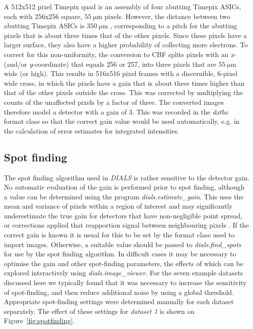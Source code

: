 \documentclass[preprint]{iucr}
\newcommand{\dxtbx}{\emph{dxtbx}\xspace}
\newcommand{\dials}{\emph{DIALS}\xspace}
\newcommand{\dialsestimategain}{\emph{dials.estimate\_gain}\xspace}
\newcommand{\dialsfindspots}{\emph{dials.find\_spots}\xspace}
\newcommand{\dialsimageviewer}{\emph{dials.image\_viewer}\xspace}
\begin{document}
A 512x512 pixel Timepix quad is an assembly of four abutting Timepix ASICs, 
each with 256x256 square, $\SI{55}{\micro\metre}$ pixels. However, the distance 
between two abutting Timepix ASICs is $\SI{350}{\micro\metre}$ , corresponding 
to a pitch for the abutting pixels that is about three times that of the other 
pixels. Since these pixels have a larger surface, they also have a higher probability 
of collecting more electrons. To correct for this non-uniformity, the conversion to 
CBF splits pixels with an \emph{x}- (and/or \emph{y}-coordinate) that equals 256 or 257, into three 
pixels that are $\SI{55}{\micro\metre}$ wide (or high). This results in 516x516 pixel 
frames with a discernible, 6-pixel wide cross, in which the pixels have a gain that 
is about three times higher than that of the other pixels outside the cross. This was 
corrected by multiplying the counts of the unaffected pixels by a factor of three. The 
converted images therefore model a detector with a gain of 3. This was recorded in the 
\dxtbx format class so that the correct gain value would be used automatically, e.g. 
in the calculation of error estimates for integrated intensities.

\subsection{Spot finding \label{sec:spot_finding}}

The spot finding algorithm used in \dials is rather sensitive to the detector
gain. No automatic evaluation of the gain is performed prior to spot finding,
although a value can be determined using the program \dialsestimategain. This
uses the mean and variance of pixels within a region of interest
\cite{leslie2006integration} and may significantly underestimate the true gain
for detectors that have non-negligible point spread, or corrections applied
that reapportion signal between neighbouring pixels \cite{Waterman2010}. If the
correct gain is known it is usual for this to be set by the format class used
to import images. Otherwise, a suitable value should be passed to
\dialsfindspots for use by the spot finding algorithm. In difficult cases it
may be necessary to optimise the gain and other spot-finding parameters, the
effects of which can be explored interactively using \dialsimageviewer. For the
seven example datasets discussed here we typically found that it was necessary
to increase the sensitivity of spot-finding, and then reduce additional noise
by using a global threshold. Appropriate spot-finding settings were determined
manually for each dataset separately. The effect of these settings for
\emph{dataset 1} is shown on Figure~\ref{fig:spotfinding}.
\end{document}
